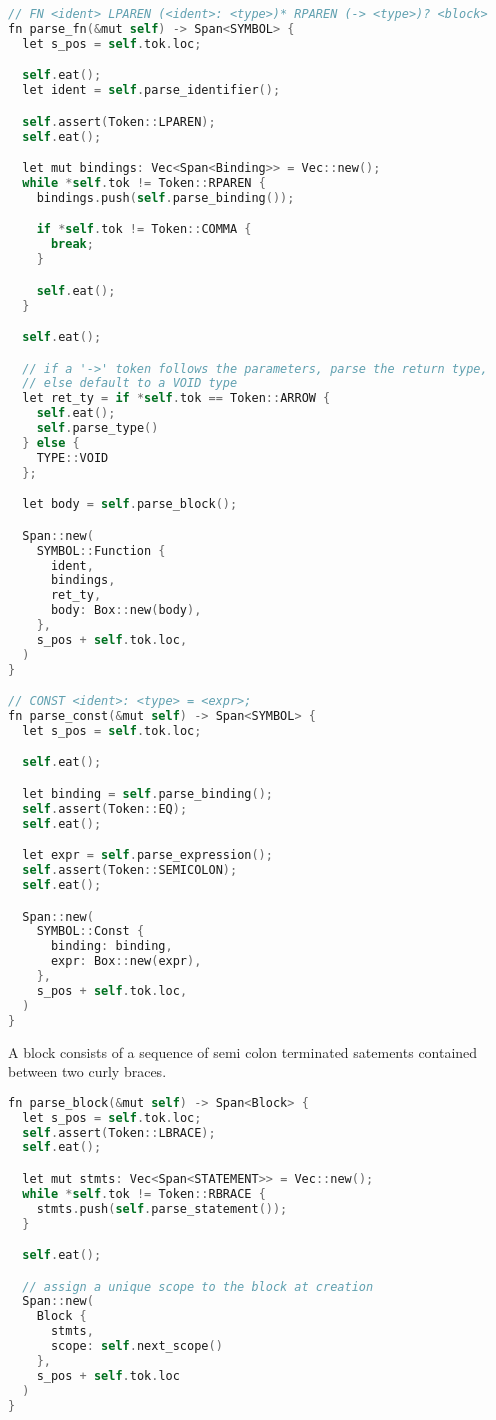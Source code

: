 \label{CompilerParseSymbol}
\begin{lstlisting}[language=C]
// FN <ident> LPAREN (<ident>: <type>)* RPAREN (-> <type>)? <block> 
fn parse_fn(&mut self) -> Span<SYMBOL> {
  let s_pos = self.tok.loc;

  self.eat();
  let ident = self.parse_identifier();

  self.assert(Token::LPAREN);
  self.eat();

  let mut bindings: Vec<Span<Binding>> = Vec::new();
  while *self.tok != Token::RPAREN {
    bindings.push(self.parse_binding());

    if *self.tok != Token::COMMA {
      break;
    }

    self.eat();
  }

  self.eat();

  // if a '->' token follows the parameters, parse the return type,
  // else default to a VOID type
  let ret_ty = if *self.tok == Token::ARROW {
    self.eat();
    self.parse_type()
  } else {
    TYPE::VOID
  };

  let body = self.parse_block();

  Span::new(
    SYMBOL::Function {
      ident,
      bindings,
      ret_ty,
      body: Box::new(body),
    },
    s_pos + self.tok.loc,
  )
}

// CONST <ident>: <type> = <expr>;
fn parse_const(&mut self) -> Span<SYMBOL> {
  let s_pos = self.tok.loc;

  self.eat();

  let binding = self.parse_binding();
  self.assert(Token::EQ);
  self.eat();

  let expr = self.parse_expression();
  self.assert(Token::SEMICOLON);
  self.eat();

  Span::new(
    SYMBOL::Const {
      binding: binding,
      expr: Box::new(expr),
    },
    s_pos + self.tok.loc,
  )
}
\end{lstlisting}

A block consists of a sequence of semi colon terminated satements contained between two curly braces. 

\begin{lstlisting}[language=C]
fn parse_block(&mut self) -> Span<Block> {
  let s_pos = self.tok.loc;
  self.assert(Token::LBRACE);
  self.eat();

  let mut stmts: Vec<Span<STATEMENT>> = Vec::new();
  while *self.tok != Token::RBRACE {
    stmts.push(self.parse_statement());
  }

  self.eat();

  // assign a unique scope to the block at creation
  Span::new(
    Block { 
      stmts, 
      scope: self.next_scope() 
    }, 
    s_pos + self.tok.loc
  )
}
\end{lstlisting}

